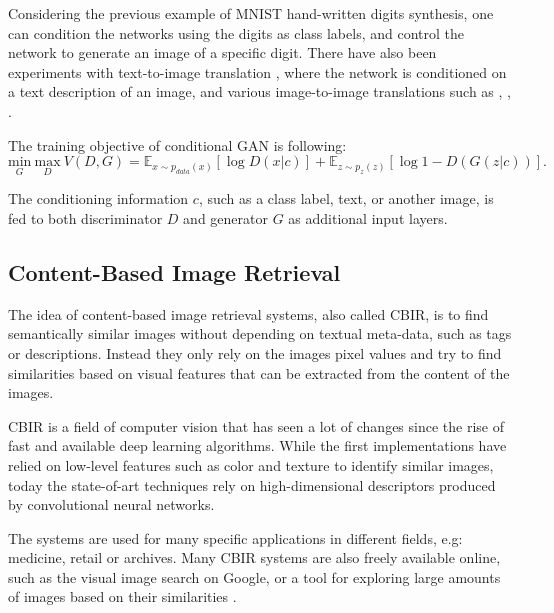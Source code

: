 \documentclass{article}
\begin{document}
Considering the previous example of MNIST hand-written digits synthesis, one can condition the networks using the digits as class labels, and control the network to generate an image of a specific digit. There have also been experiments with text-to-image translation \cite{reed_generative_2016}, where the network is conditioned on a text description of an image, and various image-to-image translations such as \cite{yoo_pixel-level_2016}, \cite{yoo_pixel-level_2016}, \cite{pathak_context_2016}.

 The training objective of conditional GAN is following:
\begin{equation}
\underset{G}{\mathrm{min}} \ \underset{D}{\mathrm{max}} \ V(D,G) = \mathbb{E}_{x \sim p_{data}(x)}[\log D(x|c)] + \mathbb{E}_{z \sim p_{z}(z)}[\log 1 - D(G(z|c))].
\label{eq:cgan}
\end{equation}

The conditioning information $c$, such as a class label, text, or another image, is fed to both discriminator $D$ and generator $G$ as additional input layers. 

\pagebreak
\subsection{Content-Based Image Retrieval}
The idea of content-based image retrieval systems, also called CBIR, is to find semantically similar images without depending on textual meta-data, such as tags or descriptions. Instead they only rely on the images pixel values and try to find similarities based on visual features that can be extracted from the content of the images.

CBIR is a field of computer vision that has seen a lot of changes since the rise of fast and available deep learning algorithms. While the first implementations have relied on low-level features such as color and texture to identify similar images, today the state-of-art techniques rely on high-dimensional descriptors produced by convolutional neural networks.

The systems are used for many specific applications in different fields, e.g: medicine, retail or archives. Many CBIR systems are also freely available online, such as the visual image search on Google, or a tool for exploring large amounts of images based on their similarities \cite{Barthel:2017:VBM:3078971.3079016}.
\end{document}
